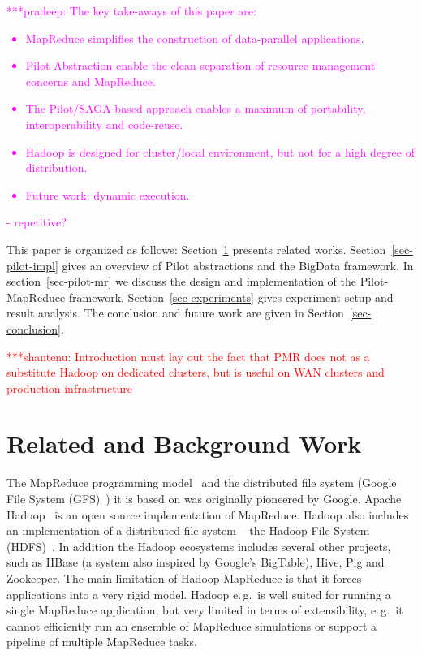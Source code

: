 \documentclass{acm_proc_article-sp}
\newcommand{\jhanote}[1]{ {\textcolor{red} { ***shantenu: #1 }}}
\newcommand{\pnote}[1]{ {\textcolor{magenta} { ***pradeep: #1 }}}
\newcommand{\pnote}[1]{}
\newcommand{\jhanote}[1]{}
\newcommand{\pilot}{Pilot\xspace}
\newcommand{\pilotmapreduce}{Pilot-MapReduce\xspace}
\begin{document}
\pnote{The key take-aways of this paper are:
\begin{itemize}
	\item MapReduce simplifies the construction of data-parallel applications.
	\item Pilot-Abstraction enable the clean separation of resource management concerns and MapReduce.
	\item The Pilot/SAGA-based approach enables a maximum of portability, interoperability and code-reuse.
	\item Hadoop is designed for cluster/local environment, but not for a high degree of distribution.
	\item Future work: dynamic execution.
\end{itemize}  - repetitive? }

This paper is organized as follows: Section~\ref{sec:related_work} presents
related works. Section~\ref{sec-pilot-impl} gives an overview of \pilot
abstractions and the BigData framework. In section~\ref{sec-pilot-mr} we discuss
the design and implementation of the \pilotmapreduce framework.
Section~\ref{sec-experiments} gives experiment setup and result analysis. The
conclusion and future work are given in Section~\ref{sec-conclusion}.

\jhanote{Introduction must lay out the fact that PMR does not as a
  substitute Hadoop on dedicated clusters, but is useful on WAN
  clusters and production infrastructure}

\section{Related and Background Work}
\label{sec:related_work}
The MapReduce programming model~\cite{Dean:2004:MSD:1251254.1251264}
and the distributed file system (Google File System
(GFS)~\cite{Ghemawat:2003:GFS:1165389.945450}) it is based on was
originally pioneered by Google. Apache Hadoop~\cite{hadoop} is an open
source implementation of MapReduce. Hadoop also includes an
implementation of a distributed file system -- the Hadoop File System
(HDFS)~\cite{Borthakur:2007fk}. In addition the Hadoop ecosystems
includes several other projects, such as HBase (a system also inspired
by Google's BigTable), Hive, Pig and Zookeeper. The main limitation of
Hadoop MapReduce is that it forces applications into a very rigid
model. Hadoop e.\,g.\ is well suited for running a single MapReduce
application, but very limited in terms of extensibility, e.\,g.\ it
cannot efficiently run an ensemble of MapReduce simulations or support
a pipeline of multiple MapReduce tasks.
\end{document}
